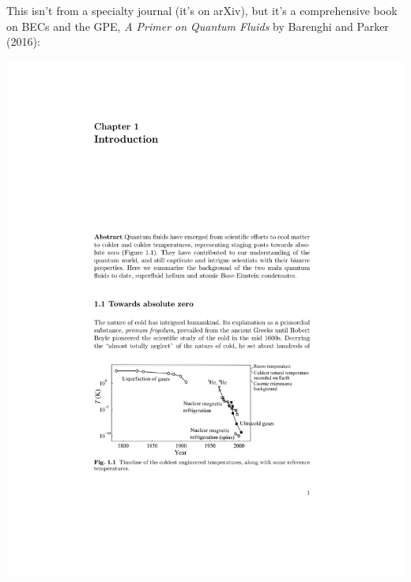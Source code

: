 \documentclass{homework}
\begin{document}
\begin{enumerate}
		This isn't from a specialty journal (it's on arXiv), but it's a comprehensive book on BECs and the GPE, \textit{A Primer on Quantum Fluids} by Barenghi and Parker (2016):
		\begin{center}
			\includegraphics[width=\linewidth,page=1]{1605.09580.pdf}

\end{center}
\end{enumerate}
\end{document}
